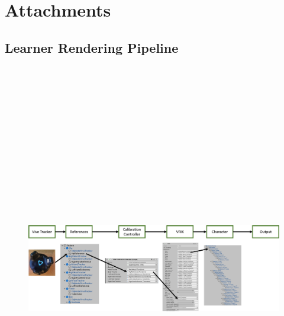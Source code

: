 \chapter{Attachments}

\section{Learner Rendering Pipeline}
\label{a:studentRenderingPipeline}
\begin{figure}[H]
	\includegraphics[angle=90,height=18cm]{figures/studentRenderingPipeline.png}
\end{figure}

\newpage
